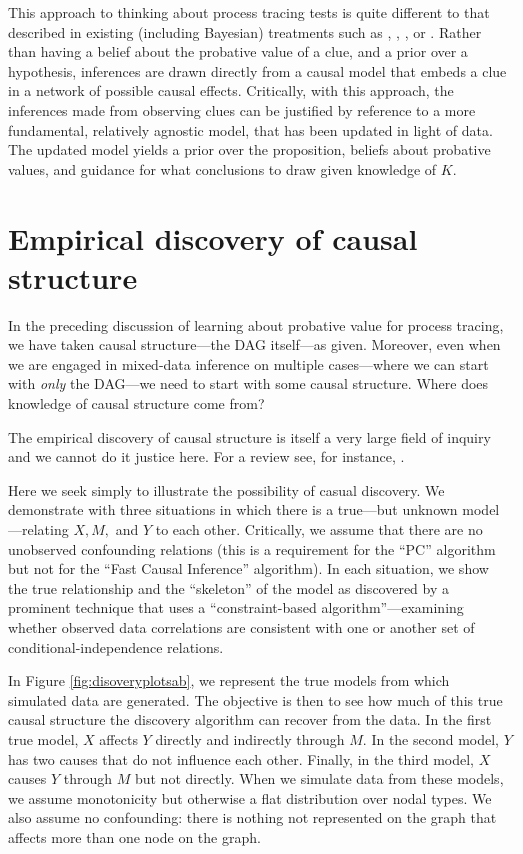 \documentclass[
  12pt,
]{book}
\begin{document}
This approach to thinking about process tracing tests is quite different to that described in existing (including Bayesian) treatments such as \citet{collier2011understanding}, \citet{BennettAppendix}, \citet{fairfield2017explicit}, or \citet{humphreys2015mixing}. Rather than having a belief about the probative value of a clue, and a prior over a hypothesis, inferences are drawn directly from a causal model that embeds a clue in a network of possible causal effects. Critically, with this approach, the inferences made from observing clues can be justified by reference to a more fundamental, relatively agnostic model, that has been updated in light of data. The updated model yields a prior over the proposition, beliefs about probative values, and guidance for what conclusions to draw given knowledge of \(K\).

\hypertarget{empirical-discovery-of-causal-structure}{%
\section{Empirical discovery of causal structure}\label{empirical-discovery-of-causal-structure}}

In the preceding discussion of learning about probative value for process tracing, we have taken causal structure---the DAG itself---as given. Moreover, even when we are engaged in mixed-data inference on multiple cases---where we can start with \emph{only} the DAG---we need to start with some causal structure. Where does knowledge of causal structure come from?

The empirical discovery of causal structure is itself a very large field of inquiry and we cannot do it justice here. For a review see, for instance, \citet{glymour2019review}.

Here we seek simply to illustrate the possibility of casual discovery. We demonstrate with three situations in which there is a true---but unknown model---relating \(X,M,\) and \(Y\) to each other. Critically, we assume that there are no unobserved confounding relations (this is a requirement for the ``PC'' algorithm but not for the ``Fast Causal Inference'' algorithm). In each situation, we show the true relationship and the ``skeleton'' of the model as discovered by a prominent technique that uses a ``constraint-based algorithm''---examining whether observed data correlations are consistent with one or another set of conditional-independence relations.

In Figure \ref{fig:disoveryplotsab}, we represent the true models from which simulated data are generated. The objective is then to see how much of this true causal structure the discovery algorithm can recover from the data. In the first true model, \(X\) affects \(Y\) directly and indirectly through \(M\). In the second model, \(Y\) has two causes that do not influence each other. Finally, in the third model, \(X\) causes \(Y\) through \(M\) but not directly. When we simulate data from these models, we assume monotonicity but otherwise a flat distribution over nodal types. We also assume no confounding: there is nothing not represented on the graph that affects more than one node on the graph.
\end{document}
